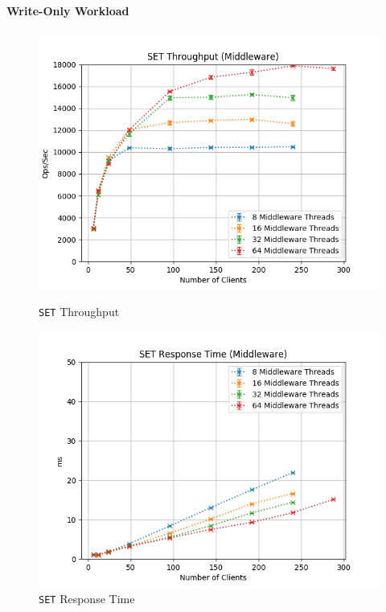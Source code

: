 \documentclass[11pt,a4paper]{article}
\begin{document}
\paragraph{Write-Only Workload}
%
\begin{figure}[H]
	\centering
	\captionsetup{width=0.4\textwidth}
    \begin{minipage}{0.5\textwidth}
        \centering
        \includegraphics[width=\textwidth]{../illustrations/plots/2_2_two_middlewares/1-0/middleware_set_tp_s.png}
        \caption{\texttt{SET} Throughput}
        \label{fig:two_middlewares_set_tp_mw}
    \end{minipage}\hfill
    \begin{minipage}{0.5\textwidth}
        \centering
        \includegraphics[width=\textwidth]{../illustrations/plots/2_2_two_middlewares/1-0/middleware_set_rt_ms.png}
        \caption{\texttt{SET} Response Time}
        \label{fig:two_middlewares_set_rt_mw}
    \end{minipage}
\end{figure}
\end{document}
